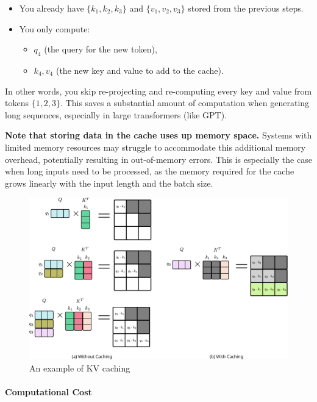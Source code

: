 \begin{itemize}
	\item You already have \(\{k_1, k_2, k_3\}\) and \(\{v_1, v_2, v_3\}\) stored from the previous steps.  
	\item You only compute:
		\begin{itemize}
			\item \(q_4\) (the query for the new token),
			\item \(k_4, v_4\) (the new key and value to add to the cache).  
		\end{itemize}
\end{itemize}
In other words, you skip re-projecting and re-computing every key and value from tokens \(\{1,2,3\}\). This saves a substantial amount of computation when generating long sequences, especially in large transformers (like GPT).

\textbf{Note that storing data in the cache uses up memory space.} Systems with limited memory resources may struggle to accommodate this additional memory overhead, potentially resulting in out-of-memory errors. This is especially the case when long inputs need to be processed, as the memory required for the cache grows linearly with the input length and the batch size.

\begin{figure}[t]
	\centering
	\includegraphics[scale=0.8]{./images/transformer/kv_caching.pdf}
	\caption{An example of KV caching}
\end{figure}

\paragraph{Computational Cost}


